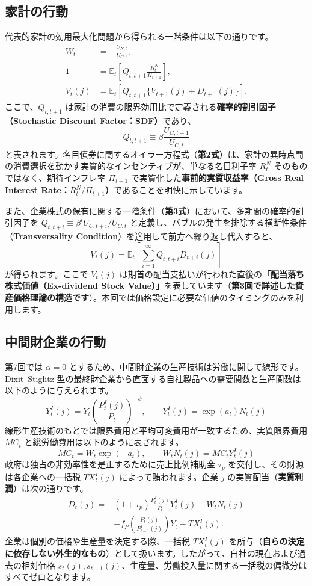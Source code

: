 \documentclass[
  japanese,
  lualatex,
  ja=standard,
  12pt,
  a4paper]{ltjsarticle}
\begin{document}
\subsection{家計の行動}\label{ux5bb6ux8a08ux306eux884cux52d5}

代表的家計の効用最大化問題から得られる一階条件は以下の通りです。 \[
\begin{aligned}
W_t&=-\frac{U_{N,t}}{U_{C,t}},\\
1&=\mathbb{E}_t\left[Q_{t,t+1}\frac{R_t^N}{\Pi_{t+1}}\right],\\
V_t(j)&=\mathbb{E}_t\left[Q_{t,t+1}\{V_{t+1}(j)+D_{t+1}(j)\}\right].
\end{aligned}
\] ここで、\(Q_{t,t+1}\)
は家計の消費の限界効用比で定義される\textbf{確率的割引因子（Stochastic
Discount Factor：SDF）}であり、 \[
Q_{t,t+1}\equiv \beta\frac{U_{C,t+1}}{U_{C,t}}
\]
と表されます。名目債券に関するオイラー方程式（\textbf{第2式}）は、家計の異時点間の消費選択を動かす実質的なインセンティブが、単なる名目利子率
\(R_t^N\) そのものではなく、期待インフレ率 \(\Pi_{t+1}\)
で実質化した\textbf{事前的実質収益率（Gross Real Interest
Rate：\(R_t^N/\Pi_{t+1}\)）}であることを明快に示しています。

また、企業株式の保有に関する一階条件（\textbf{第3式}）において、多期間の確率的割引因子を
\(Q_{t,t+i}\equiv \beta^i U_{C,t+i}/U_{C,t}\)
と定義し、バブルの発生を排除する横断性条件（\textbf{Transversality
Condition}）を適用して前方へ繰り返し代入すると、 \[
V_t(j)
=
\mathbb{E}_t
\left[
\sum_{i=1}^{\infty}
Q_{t,t+i}D_{t+i}(j)
\right]
\] が得られます。ここで \(V_t(j)\)
は期首の配当支払いが行われた直後の\textbf{「配当落ち株式価値（Ex-dividend
Stock
Value）」}を表しています（\textbf{第3回で詳述した資産価格理論の構造です}）。本回では価格設定に必要な価値のタイミングのみを利用します。

\subsection{中間財企業の行動}\label{ux4e2dux9593ux8ca1ux4f01ux696dux306eux884cux52d5}

第7回では \(\alpha=0\)
とするため、中間財企業の生産技術は労働に関して線形です。Dixit--Stiglitz
型の最終財企業から直面する自社製品への需要関数と生産関数は以下のように与えられます。
\[
Y_t^I(j)=Y_t\left(\frac{P_t^I(j)}{P_t}\right)^{-\psi},
\qquad
Y_t^I(j)=\exp(a_t)N_t(j)
\]
線形生産技術のもとでは限界費用と平均可変費用が一致するため、実質限界費用
\(MC_t\) と総労働費用は以下のように表されます。 \[
MC_t= W_t\exp(-a_t),
\qquad
W_tN_t(j)=MC_tY_t^I(j)
\] 政府は独占の非効率性を是正するために売上比例補助金 \(\tau_p\)
を交付し、その財源は各企業への一括税 \(TX_t^I(j)\)
によって賄われます。企業 \(j\)
の実質配当（\textbf{実質利潤}）は次の通りです。 \[
\begin{aligned}
D_t(j)={}&
(1+\tau_p)\frac{P_t^I(j)}{P_t}Y_t^I(j)
-W_tN_t(j)\\
&-f_P\left(\frac{P_t^I(j)}{P_{t-1}^I(j)}\right)Y_t
-TX_t^I(j).
\end{aligned}
\] 企業は個別の価格や生産量を決定する際、一括税 \(TX_t^I(j)\)
を所与（\textbf{自らの決定に依存しない外生的なもの}）として扱います。したがって、自社の現在および過去の相対価格
\(s_t(j), s_{t-1}(j)\)、生産量、労働投入量に関する一括税の偏微分はすべてゼロとなります。
\end{document}
